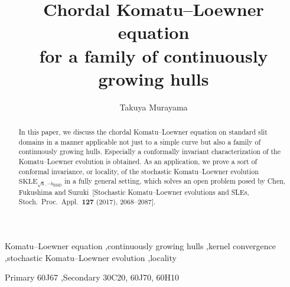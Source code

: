 \documentclass[preprint,12pt]{elsarticle}
\theoremstyle{definition}
\begin{document}
\begin{frontmatter}



\title{Chordal Komatu--Loewner equation \\
for a family of continuously growing hulls}


\author[kyoto]{Takuya Murayama}
\address[kyoto]{Department of Mathematics, Kyoto University, Kyoto 606-8502, Japan}

\begin{abstract}
In this paper, we discuss the chordal Komatu--Loewner equation
on standard slit domains in a manner applicable
not just to a simple curve but also a family of continuously growing hulls.
Especially a conformally invariant characterization of
the Komatu--Loewner evolution is obtained.
As an application, we prove a sort of conformal invariance, or locality,
of the stochastic Komatu--Loewner evolution
$\mathrm{SKLE}_{\sqrt{6}, -b_{\mathrm{BMD}}}$ in a fully general setting,
which solves an open problem posed by Chen, Fukushima and
Suzuki~[Stochastic Komatu--Loewner evolutions and SLEs,
Stoch.\ Proc.\ Appl.\ \textbf{127} (2017), 2068--2087].
\end{abstract}

\begin{keyword}
Komatu--Loewner equation \sep continuously growing hulls
\sep kernel convergence \sep stochastic Komatu--Loewner evolution
\sep locality

\MSC[2010] Primary 60J67 \sep Secondary 30C20, 60J70, 60H10
\end{keyword}

\end{frontmatter}
\end{document}
